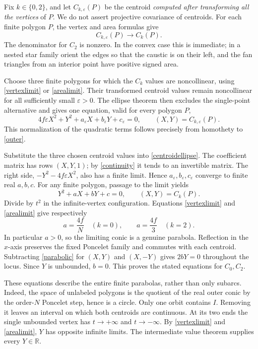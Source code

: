 \documentclass[11pt]{article}
\newcommand{\R}{\mathbb R}
\begin{document}
Fix $k\in\{0,2\}$, and let $C_{k,\varepsilon}(P)$ be the centroid
\emph{computed after transforming all the vertices} of $P$.
We do not assert projective covariance of centroids. For each finite
polygon $P$, the vertex and area formulas give
\begin{equation}\label{continuity}
 C_{k,\varepsilon}(P)\longrightarrow C_k(P).
\end{equation}
The denominator for $C_2$ is nonzero. In the convex case this is
immediate; in a nested star family orient the edges so that the
caustic is on their left, and the fan triangles from an interior
point have positive signed area.

Choose three finite polygons for which the $C_k$ values are
noncollinear, using \eqref{vertexlimit} or \eqref{arealimit}.
Their transformed centroid values remain noncollinear for all
sufficiently small $\varepsilon>0$. The ellipse theorem then excludes
the single-point alternative and gives one equation, valid for
every polygon $P$,
\begin{equation}\label{centroidellipse}
 4f\varepsilon X^2+Y^2+
 a_\varepsilon X+b_\varepsilon Y+c_\varepsilon=0,
 \qquad (X,Y)=C_{k,\varepsilon}(P).
\end{equation}
This normalization of the quadratic terms follows precisely from
homothety to \eqref{outer}.

Substitute the three chosen centroid values into
\eqref{centroidellipse}. The coefficient matrix has rows $(X,Y,1)$;
by \eqref{continuity} it tends to an invertible matrix. The right
side, $-Y^2-4f\varepsilon X^2$, also has a finite limit. Hence
$a_\varepsilon,b_\varepsilon,c_\varepsilon$ converge to finite real
$a,b,c$. For any finite polygon, passage to the limit yields
\begin{equation}\label{parabolic}
 Y^2+aX+bY+c=0,\qquad (X,Y)=C_k(P).
\end{equation}
Divide by $t^2$ in the infinite-vertex configuration. Equations
\eqref{vertexlimit} and \eqref{arealimit} give respectively
\[
 a=\frac{4f}{N}\quad(k=0),\qquad
 a=\frac{4f}{3}\quad(k=2).
\]
In particular $a>0$, so the limiting conic is a genuine parabola.
Reflection in the $x$-axis preserves the fixed Poncelet family and
commutes with each centroid. Subtracting \eqref{parabolic} for
$(X,Y)$ and $(X,-Y)$ gives $2bY=0$ throughout the locus. Since $Y$
is unbounded, $b=0$. This proves the stated equations for $C_0,C_2$.

These equations describe the entire finite parabolas, rather than
only subarcs. Indeed, the space of unlabeled polygons is the quotient
of the real outer conic by the order-$N$ Poncelet step, hence is a
circle. Only one orbit contains $I$. Removing it leaves an interval
on which both centroids are continuous. At its two ends the single
unbounded vertex has $t\to+\infty$ and $t\to-\infty$. By
\eqref{vertexlimit} and \eqref{arealimit}, $Y$ has opposite infinite
limits. The intermediate value theorem supplies every $Y\in\R$.
\end{document}
